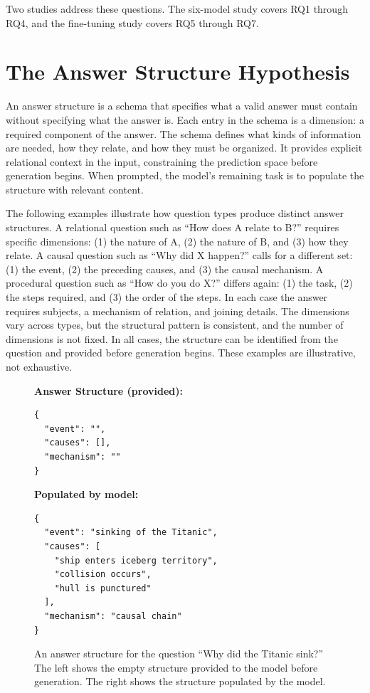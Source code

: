 \documentclass[master]{thesis}
\begin{document}
Two studies address these questions. The six-model study covers RQ1 through RQ4, and the fine-tuning study covers RQ5 through RQ7.

\section{The Answer Structure Hypothesis}
\label{sec:taxhyp}

An answer structure is a schema that specifies what a valid answer must contain without specifying what the answer is. Each entry in the schema is a dimension: a required component of the answer. The schema defines what kinds of information are needed, how they relate, and how they must be organized. It provides explicit relational context in the input, constraining the prediction space before generation begins. When prompted, the model's remaining task is to populate the structure with relevant content.

The following examples illustrate how question types produce distinct answer structures. A relational question such as ``How does A relate to B?'' requires specific dimensions: (1) the nature of A, (2) the nature of B, and (3) how they relate. A causal question such as ``Why did X happen?'' calls for a different set: (1) the event, (2) the preceding causes, and (3) the causal mechanism. A procedural question such as ``How do you do X?'' differs again: (1) the task, (2) the steps required, and (3) the order of the steps. In each case the answer requires subjects, a mechanism of relation, and joining details. The dimensions vary across types, but the structural pattern is consistent, and the number of dimensions is not fixed. In all cases, the structure can be identified from the question and provided before generation begins. These examples are illustrative, not exhaustive.

\begin{figure}[ht]
\centering
\begin{minipage}[t]{0.45\textwidth}
\textbf{Answer Structure (provided):}
\begin{verbatim}
{
  "event": "",
  "causes": [],
  "mechanism": ""
}
\end{verbatim}
\end{minipage}
\hfill
\begin{minipage}[t]{0.45\textwidth}
\textbf{Populated by model:}
\begin{verbatim}
{
  "event": "sinking of the Titanic",
  "causes": [
    "ship enters iceberg territory",
    "collision occurs",
    "hull is punctured"
  ],
  "mechanism": "causal chain"
}
\end{verbatim}
\end{minipage}
\caption{An answer structure for the question ``Why did the Titanic sink?'' The left shows the empty structure provided to the model before generation. The right shows the structure populated by the model.}
\label{fig:answer_structure_example}
\end{figure}
\end{document}

